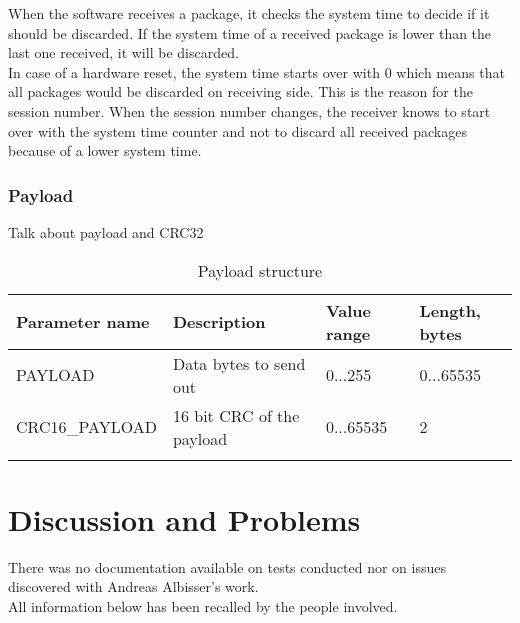 When the software receives a package, it checks the system time to decide if it should be discarded. If the system time of a received package is lower than the last one received, it will be discarded.\\
In case of a hardware reset, the system time starts over with 0 which means that all packages would be discarded on receiving side. This is the reason for the session number. When the session number changes, the receiver knows to start over with the system time counter and not to discard all received packages because of a lower system time.
%
\subsubsection{Payload}
Talk about payload and CRC32
%
%
\begin{center}
    \begin{longtable}{p{3cm}p{8cm}p{2cm}p{1cm}}
        \hline
        \textbf{Parameter name} & \textbf{Description} & \textbf{Value range} & \textbf{Length, bytes} \\
        \hline
        PAYLOAD & Data bytes to send out & 0...255 & 0...65535\\
        \hline
        CRC16\_PAYLOAD &  16 bit CRC of the payload & 0...65535 & 2\\
        \hline
        \caption{Payload structure}
        \label{tab:tabPayloadStructure}    
    \end{longtable}
\end{center}
%
%
%
%
%
\section{Discussion and Problems} \label{sec:txtTeensy3.2SoftwareProblems}
There was no documentation available on tests conducted nor on issues discovered with Andreas Albisser's work.\\
All information below has been recalled by the people involved.
%
%
